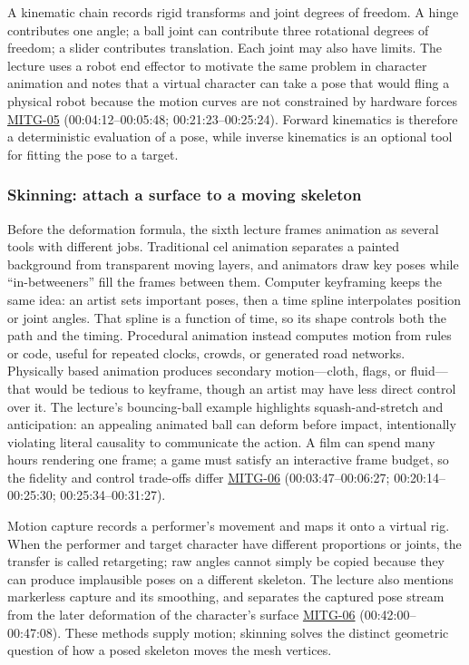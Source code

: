A kinematic chain records rigid transforms and joint degrees of freedom. A hinge contributes one angle; a ball joint can contribute three rotational degrees of freedom; a slider contributes translation. Each joint may also have limits. The lecture uses a robot end effector to motivate the same problem in character animation and notes that a virtual character can take a pose that would fling a physical robot because the motion curves are not constrained by hardware forces \hyperref[04-visual-computing-ii-ch036]{MITG-05} (00:04:12--00:05:48; 00:21:23--00:25:24). Forward kinematics is therefore a deterministic evaluation of a pose, while inverse kinematics is an optional tool for fitting the pose to a target.

\subsubsection{Skinning: attach a surface to a moving skeleton}\label{skinning-attach-a-surface-to-a-moving-skeleton}

Before the deformation formula, the sixth lecture frames animation as several tools with different jobs. Traditional cel animation separates a painted background from transparent moving layers, and animators draw key poses while ``in-betweeners'' fill the frames between them. Computer keyframing keeps the same idea: an artist sets important poses, then a time spline interpolates position or joint angles. That spline is a function of time, so its shape controls both the path and the timing. Procedural animation instead computes motion from rules or code, useful for repeated clocks, crowds, or generated road networks. Physically based animation produces secondary motion---cloth, flags, or fluid---that would be tedious to keyframe, though an artist may have less direct control over it. The lecture's bouncing-ball example highlights squash-and-stretch and anticipation: an appealing animated ball can deform before impact, intentionally violating literal causality to communicate the action. A film can spend many hours rendering one frame; a game must satisfy an interactive frame budget, so the fidelity and control trade-offs differ \hyperref[04-visual-computing-ii-ch036]{MITG-06} (00:03:47--00:06:27; 00:20:14--00:25:30; 00:25:34--00:31:27).

Motion capture records a performer's movement and maps it onto a virtual rig. When the performer and target character have different proportions or joints, the transfer is called retargeting; raw angles cannot simply be copied because they can produce implausible poses on a different skeleton. The lecture also mentions markerless capture and its smoothing, and separates the captured pose stream from the later deformation of the character's surface \hyperref[04-visual-computing-ii-ch036]{MITG-06} (00:42:00--00:47:08). These methods supply motion; skinning solves the distinct geometric question of how a posed skeleton moves the mesh vertices.

